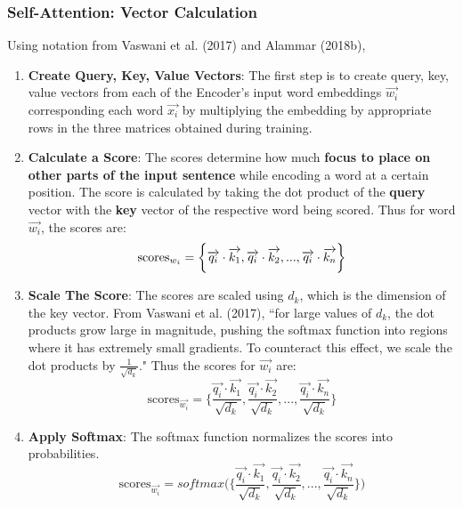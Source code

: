\subsubsection{Self-Attention: Vector Calculation}

Using notation from Vaswani et al. (2017) and Alammar (2018b), 

\begin{enumerate}
    \item \textbf{Create Query, Key, Value Vectors}: The first step is to create query, key, value vectors from each of the Encoder's input word embeddings $\overrightarrow{w_i}$ corresponding each word $\overrightarrow{x_i}$ by multiplying the embedding by appropriate rows in the three matrices obtained during training. \newline

    \item \textbf{Calculate a Score}: The scores determine how much \textbf{focus to place on other parts of the input sentence} while encoding a word at a certain position.  The score is calculated by taking the dot product of the \textbf{query} vector with the \textbf{key} vector of the respective word being scored. Thus for word $\overrightarrow{w_i}$, the scores are: 
    $$
    \text{scores}_{\Large w_i} = \bigg\{
    \overrightarrow{q_i} \cdot \overrightarrow{k_1},
    \overrightarrow{q_i} \cdot \overrightarrow{k_2},
    ...,
    \overrightarrow{q_i} \cdot \overrightarrow{k_n} \bigg\}
    $$

    \item \textbf{Scale The Score}: The scores are scaled using $d_k$, which is the dimension of the key vector. From Vaswani et al. (2017), ``for large values of $d_k$, the dot products grow large in  magnitude, pushing the softmax function into regions where it has extremely small gradients. To counteract this effect, we scale the dot products by $\frac {1} {\sqrt{d_k}}$." Thus the scores for $\overrightarrow{w_i}$ are:
    $$
    \text{scores}_{\overrightarrow{w_i}} = \Bigg\{
    \frac {\overrightarrow{q_i} \cdot \overrightarrow{k_1}} {\sqrt{d_k}},
    \frac {\overrightarrow{q_i} \cdot \overrightarrow{k_2}} {\sqrt{d_k}},
    ...,
    \frac{\overrightarrow{q_i} \cdot \overrightarrow{k_n}} {\sqrt{d_k}} \Bigg\}
    $$
    
    \item \textbf{Apply Softmax}: The softmax function normalizes the scores into probabilities. 
    $$
    \text{scores}_{\overrightarrow{w_i}} = softmax \Bigg( \Bigg\{
    \frac {\overrightarrow{q_i} \cdot \overrightarrow{k_1}} {\sqrt{d_k}},
    \frac {\overrightarrow{q_i} \cdot \overrightarrow{k_2}} {\sqrt{d_k}},
    ...,
    \frac{\overrightarrow{q_i} \cdot \overrightarrow{k_n}} {\sqrt{d_k}} \Bigg\} \Bigg)
    $$


\end{enumerate}
